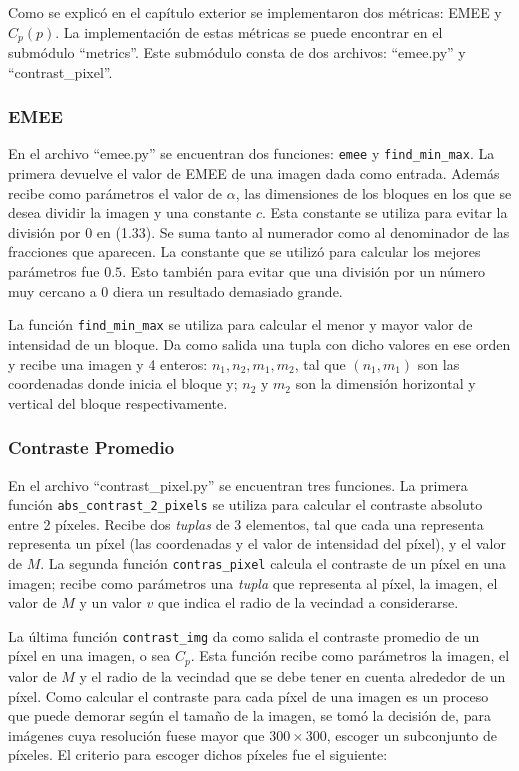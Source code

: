 Como se explic\'o en el cap\'itulo exterior se implementaron dos m\'etricas: EMEE y $C_p(p)$. La implementaci\'on de estas m\'etricas se puede encontrar en el subm\'odulo ``metrics''. Este subm\'odulo consta de dos archivos: ``emee.py'' y ``contrast\_pixel''. 

\subsubsection{EMEE}
En el archivo ``emee.py'' se encuentran dos funciones: \verb|emee| y \verb|find_min_max|. La primera devuelve el valor de EMEE de una imagen dada como entrada. Adem\'as recibe como par\'ametros el valor de $\alpha$, las dimensiones de los bloques en los que se desea dividir la imagen y una constante $c$. Esta constante se utiliza para evitar la divisi\'on por $0$ en (1.33). Se suma tanto al numerador como al denominador de las fracciones que aparecen. La constante que se utiliz\'o para calcular los mejores par\'ametros fue $0.5$. Esto tambi\'en para evitar que una divisi\'on por un n\'umero muy cercano a 0 diera un resultado demasiado grande. 

La funci\'on \verb|find_min_max| se utiliza para calcular el menor y mayor valor de intensidad de un bloque. Da como salida una tupla con dicho valores en ese orden y recibe una imagen y 4 enteros: $n_1,n_2,m_1,m_2$, tal que $(n_1,m_1)$ son las coordenadas donde inicia el bloque y; $n_2$ y $m_2$ son la dimensi\'on horizontal y vertical del bloque respectivamente.

\subsubsection{Contraste Promedio}
En el archivo ``contrast\_pixel.py'' se encuentran tres funciones. La primera funci\'on \verb|abs_contrast_2_pixels| se utiliza para calcular el contraste absoluto entre 2 p\'ixeles. Recibe dos \textit{tuplas} de 3 elementos, tal que cada una representa representa un p\'ixel (las coordenadas y el valor de intensidad del p\'ixel), y el valor de $M$.  La segunda funci\'on \verb|contras_pixel| calcula el contraste de un p\'ixel en una imagen; recibe como par\'ametros una \textit{tupla} que representa al p\'ixel, la imagen, el valor de $M$ y un valor $v$ que indica el radio de la vecindad a considerarse. 

La \'ultima funci\'on \verb|contrast_img| da como salida el contraste promedio de un p\'ixel en una imagen, o sea $C_p$. Esta funci\'on recibe como par\'ametros la imagen, el valor de $M$ y el radio de la vecindad que se debe tener en cuenta alrededor de un p\'ixel. Como calcular el contraste para cada p\'ixel de una imagen es un proceso que puede demorar seg\'un el tama\~no de la imagen, se tom\'o la decisi\'on de, para im\'agenes cuya resoluci\'on fuese mayor que $300\times300$, escoger un subconjunto de p\'ixeles. El criterio para escoger dichos p\'ixeles fue el siguiente:

